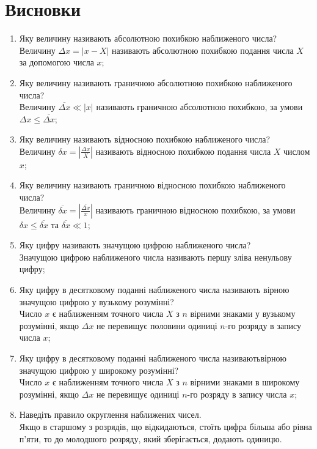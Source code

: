 \section{Висновки}
\label{sec:summary}

\begin{enumerate}
      \item Яку величину називають абсолютною похибкою наближеного числа? \\
            Величину $\Delta x = |x - X|$
            називають абсолютною похибкою подання числа $X$ за допомогою числа $x$;
      \item Яку величину називають граничною абсолютною похибкою наближеного числа? \\
            Величину $\overline{\Delta x} \ll |x|$
            називають граничною абсолютною похибкою,
            за умови $\Delta x \le \overline{\Delta x}$;
      \item Яку величину називають відносною похибкою наближеного числа? \\
            Величину $\delta x = |\frac{\Delta x}{X}|$
            називають відносною похибкою подання числа $X$ числом $x$;
      \item Яку величину називають граничною відносною похибкою наближеного числа? \\
            Величину $\overline{\delta x} = |\frac{\overline{\Delta x}}{x}|$
            називають граничною відносною похибкою,
            за умови $\delta x \le \overline{\delta x}$ та $\overline{\delta x} \ll 1$;
      \item Яку цифру називають значущою цифрою наближеного числа? \\
            Значущою цифрою наближеного числа називають першу зліва ненульову цифру;
      \item Яку цифру в десятковому поданні наближеного числа
            називають вірною значущою цифрою у вузькому розумінні? \\
            Число $x$ є наближенням точного числа $X$ з $n$ вірними знаками
            у вузькому розумінні, якщо $\Delta x$ не перевищує половини одиниці
            $n$-го розряду в запису числа $x$;
      \item Яку цифру в десятковому поданні наближеного числа
            називаютьвірною значущою цифрою у широкому розумінні? \\
            Число $x$ є наближенням точного числа $X$ з $n$ вірними знаками
            в широкому розумінні, якщо $\Delta x$ не перевищує одиниці
            $n$-го розряду в запису числа $x$;
      \item Наведіть правило округлення наближених чисел. \\
            Якщо в старшому з розрядів, що відкидаються,
            стоїть цифра більша або рівна п'яти,
            то до молодшого розряду, який зберігається, додають одиницю.
\end{enumerate}

